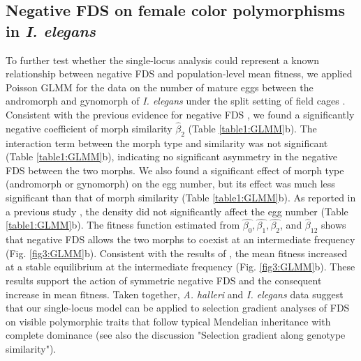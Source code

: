 \documentclass[12pt,]{article}
\begin{document}
\subsection{Negative FDS on female color polymorphisms in \textit{I. elegans}}
To further test whether the single-locus analysis could represent a known relationship between negative FDS and population-level mean fitness, we applied Poisson GLMM for the data on the number of mature eggs between the andromorph and gynomorph of \textit{I. elegans} under the split setting of field cages \citep{takahashi2014evolution}. Consistent with the previous evidence for negative FDS \citep{van2001frequency, le2015evolutionary}, we found a significantly negative coefficient of morph similarity $\hat{\beta}_2$ (Table \ref{table1:GLMM}b). The interaction term between the morph type and similarity was not significant (Table \ref{table1:GLMM}b), indicating no significant asymmetry in the negative FDS between the two morphs. We also found a significant effect of morph type (andromorph or gynomorph) on the egg number, but its effect was much less significant than that of morph similarity (Table \ref{table1:GLMM}b). As reported in a previous study \citep{takahashi2014evolution}, the density did not significantly affect the egg number (Table \ref{table1:GLMM}b). The fitness function estimated from $\hat{\beta_0}, \hat{\beta_1}, \hat{\beta_2}$, and $\hat{\beta}_{12}$ shows that negative FDS allows the two morphs to coexist at an intermediate frequency (Fig. \ref{fig3:GLMM}b). Consistent with the results of \cite{takahashi2014evolution}, the mean fitness increased at a stable equilibrium at the intermediate frequency (Fig. \ref{fig3:GLMM}b). These results support the action of symmetric negative FDS and the consequent increase in mean fitness. Taken together, \textit{A. halleri} and \textit{I. elegans} data suggest that our single-locus model can be applied to selection gradient analyses of FDS on visible polymorphic traits that follow typical Mendelian inheritance with complete dominance (see also the discussion "Selection gradient along genotype similarity").
\end{document}

